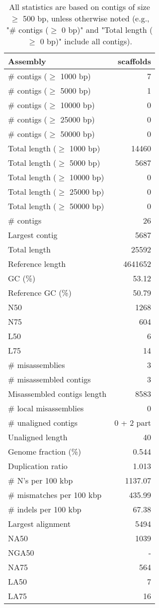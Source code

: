 \documentclass[12pt,a4paper]{article}
\begin{document}
\begin{table}[ht]
\begin{center}
\caption{All statistics are based on contigs of size $\geq$ 500 bp, unless otherwise noted (e.g., "\# contigs ($\geq$ 0 bp)" and "Total length ($\geq$ 0 bp)" include all contigs).}
\begin{tabular}{|l*{1}{|r}|}
\hline
Assembly & scaffolds \\ \hline
\# contigs ($\geq$ 1000 bp) & 7 \\ \hline
\# contigs ($\geq$ 5000 bp) & 1 \\ \hline
\# contigs ($\geq$ 10000 bp) & 0 \\ \hline
\# contigs ($\geq$ 25000 bp) & 0 \\ \hline
\# contigs ($\geq$ 50000 bp) & 0 \\ \hline
Total length ($\geq$ 1000 bp) & 14460 \\ \hline
Total length ($\geq$ 5000 bp) & 5687 \\ \hline
Total length ($\geq$ 10000 bp) & 0 \\ \hline
Total length ($\geq$ 25000 bp) & 0 \\ \hline
Total length ($\geq$ 50000 bp) & 0 \\ \hline
\# contigs & 26 \\ \hline
Largest contig & 5687 \\ \hline
Total length & 25592 \\ \hline
Reference length & 4641652 \\ \hline
GC (\%) & 53.12 \\ \hline
Reference GC (\%) & 50.79 \\ \hline
N50 & 1268 \\ \hline
N75 & 604 \\ \hline
L50 & 6 \\ \hline
L75 & 14 \\ \hline
\# misassemblies & 3 \\ \hline
\# misassembled contigs & 3 \\ \hline
Misassembled contigs length & 8583 \\ \hline
\# local misassemblies & 0 \\ \hline
\# unaligned contigs & 0 + 2 part \\ \hline
Unaligned length & 40 \\ \hline
Genome fraction (\%) & 0.544 \\ \hline
Duplication ratio & 1.013 \\ \hline
\# N's per 100 kbp & 1137.07 \\ \hline
\# mismatches per 100 kbp & 435.99 \\ \hline
\# indels per 100 kbp & 67.38 \\ \hline
Largest alignment & 5494 \\ \hline
NA50 & 1039 \\ \hline
NGA50 & - \\ \hline
NA75 & 564 \\ \hline
LA50 & 7 \\ \hline
LA75 & 16 \\ \hline
\end{tabular}
\end{center}
\end{table}
\end{document}
